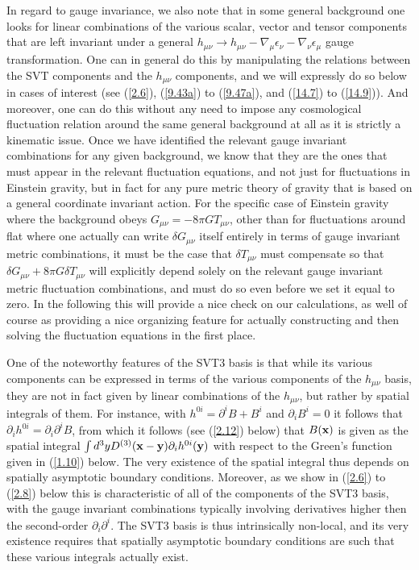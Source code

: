 \documentclass[aps,onecolumn,10pt]{revtex4}
\numberwithin{equation}{section}
\numberwithin{equation}{section}
\begin{document}
In regard to gauge invariance, we also note that in some general background one looks for linear combinations of the various scalar, vector and tensor components that are left invariant  under a general $h_{\mu\nu}\rightarrow h_{\mu\nu}-\nabla_{\mu}\epsilon_{\nu}-\nabla_{\nu}\epsilon_{\mu}$ gauge transformation. One can in general do this by manipulating the relations between the SVT components and the $h_{\mu\nu}$ components, and we will expressly do so below in cases of interest (see (\ref{2.6}), (\ref{9.43a})  to (\ref{9.47a}), and (\ref{14.7}) to (\ref{14.9})). And moreover, one can do this without any need to impose any cosmological fluctuation relation around the same general background at all as it is strictly a kinematic issue. Once we have identified the relevant gauge invariant combinations for any given background, we know that they are the ones that must appear in  the relevant fluctuation equations, and not just for fluctuations in Einstein gravity, but in fact for any pure metric theory of gravity that is based on a general coordinate invariant action. For the specific case of Einstein gravity where the background obeys $G_{\mu\nu}=-8\pi G T_{\mu\nu}$, other than for fluctuations around flat where one actually can write $\delta G_{\mu\nu}$ itself entirely in terms of gauge invariant metric combinations, it must be the case that $\delta T_{\mu\nu}$ must compensate so that $\delta G_{\mu\nu}+8\pi G \delta T_{\mu\nu}$ will explicitly depend solely on the relevant gauge invariant metric fluctuation combinations, and must do so even before we set it equal to zero. In the following this will provide a nice check on our calculations, as well of course as providing a nice organizing feature for actually constructing and then solving the fluctuation equations in the first place.

One of the noteworthy features of the SVT3 basis is that while its various components can be expressed in terms of the various components of the $h_{\mu\nu}$ basis, they are not in fact given by linear combinations of the $h_{\mu\nu}$, but rather by spatial integrals of them. For instance, with $h^{0i}=\partial^iB+B^i$ and $\partial_iB^i=0$ it follows that $\partial_ih^{0i}=\partial_i\partial^iB$, from which it follows (see (\ref{2.12}) below) that $B({\bf x})$ is given as the spatial integral $\int d^3yD^{(3)}({\bf x}-{\bf y})\partial_ih^{0i}({\bf y})$ with respect to the Green's function given in (\ref{1.10}) below. The very existence of the spatial integral thus depends on spatially asymptotic boundary conditions. Moreover, as we show in (\ref{2.6}) to (\ref{2.8}) below this is characteristic of all of the components of the  SVT3 basis, with the gauge invariant combinations typically involving derivatives higher then the second-order $\partial_i\partial^i$. The SVT3 basis is thus intrinsically non-local, and its very existence requires that spatially asymptotic boundary conditions are such that these various integrals actually exist. 
\end{document}
